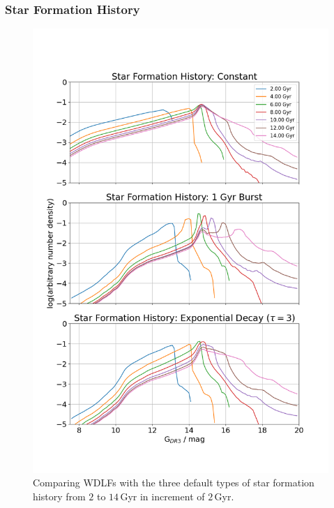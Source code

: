 \documentclass[fleqn,usenatbib]{rasti}
\begin{document}
\subsubsection{Star Formation History}
\begin{figure}
    \centering
    \includegraphics[width=\columnwidth]{wdlf_compare_sfr.png}
    \caption{Comparing WDLFs with the three default types of star formation
    history from $2$ to $14\,$Gyr in increment of $2$\,Gyr.}
    \label{fig:compare_sfr_age_type}
\end{figure}
\end{document}
